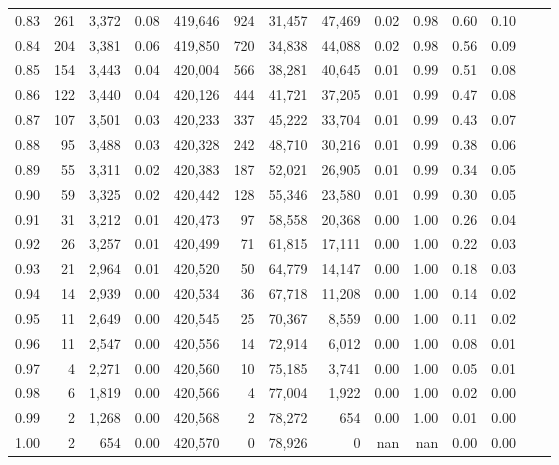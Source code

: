 \begin{tabular}{rrrrrrrrrrrrrr}
0.83 &    261 &  3,372 &     0.08 &  419,646 &      924 &  31,457 &  47,469 &  0.02 &  0.98 &  0.60 &      0.10 \\
0.84 &    204 &  3,381 &     0.06 &  419,850 &      720 &  34,838 &  44,088 &  0.02 &  0.98 &  0.56 &      0.09 \\
0.85 &    154 &  3,443 &     0.04 &  420,004 &      566 &  38,281 &  40,645 &  0.01 &  0.99 &  0.51 &      0.08 \\
0.86 &    122 &  3,440 &     0.04 &  420,126 &      444 &  41,721 &  37,205 &  0.01 &  0.99 &  0.47 &      0.08 \\
0.87 &    107 &  3,501 &     0.03 &  420,233 &      337 &  45,222 &  33,704 &  0.01 &  0.99 &  0.43 &      0.07 \\
0.88 &     95 &  3,488 &     0.03 &  420,328 &      242 &  48,710 &  30,216 &  0.01 &  0.99 &  0.38 &      0.06 \\
0.89 &     55 &  3,311 &     0.02 &  420,383 &      187 &  52,021 &  26,905 &  0.01 &  0.99 &  0.34 &      0.05 \\
0.90 &     59 &  3,325 &     0.02 &  420,442 &      128 &  55,346 &  23,580 &  0.01 &  0.99 &  0.30 &      0.05 \\
0.91 &     31 &  3,212 &     0.01 &  420,473 &       97 &  58,558 &  20,368 &  0.00 &  1.00 &  0.26 &      0.04 \\
0.92 &     26 &  3,257 &     0.01 &  420,499 &       71 &  61,815 &  17,111 &  0.00 &  1.00 &  0.22 &      0.03 \\
0.93 &     21 &  2,964 &     0.01 &  420,520 &       50 &  64,779 &  14,147 &  0.00 &  1.00 &  0.18 &      0.03 \\
0.94 &     14 &  2,939 &     0.00 &  420,534 &       36 &  67,718 &  11,208 &  0.00 &  1.00 &  0.14 &      0.02 \\
0.95 &     11 &  2,649 &     0.00 &  420,545 &       25 &  70,367 &   8,559 &  0.00 &  1.00 &  0.11 &      0.02 \\
0.96 &     11 &  2,547 &     0.00 &  420,556 &       14 &  72,914 &   6,012 &  0.00 &  1.00 &  0.08 &      0.01 \\
0.97 &      4 &  2,271 &     0.00 &  420,560 &       10 &  75,185 &   3,741 &  0.00 &  1.00 &  0.05 &      0.01 \\
0.98 &      6 &  1,819 &     0.00 &  420,566 &        4 &  77,004 &   1,922 &  0.00 &  1.00 &  0.02 &      0.00 \\
0.99 &      2 &  1,268 &     0.00 &  420,568 &        2 &  78,272 &     654 &  0.00 &  1.00 &  0.01 &      0.00 \\
1.00 &      2 &    654 &     0.00 &  420,570 &        0 &  78,926 &       0 &   nan &   nan &  0.00 &      0.00 \\
\bottomrule
\end{tabular}
